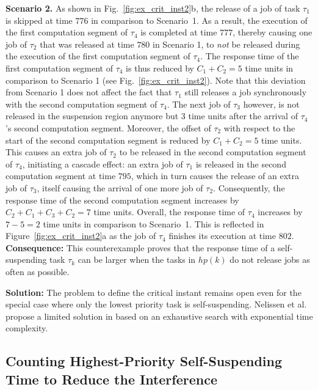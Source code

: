 \noindent\textbf{Scenario 2.} As shown in Fig.~\ref{fig:ex_crit_inst2}b, the release of a job of task $\tau_1$ is skipped at time $776$ in comparison to Scenario~1. As a result, the execution of the first computation segment of $\tau_4$ is completed at time $777$, thereby causing one job of $\tau_2$ that was released at time $780$ in Scenario 1, to \emph{not} be released during the execution of the first computation segment of $\tau_4$. The response time of the first computation segment of $\tau_4$ is thus reduced by $C_1 + C_2 = 5$ time units in comparison to Scenario 1 (see Fig.~\ref{fig:ex_crit_inst2}). Note that this deviation from Scenario 1 does not affect the fact that $\tau_1$ still releases a job synchronously with the second computation segment of $\tau_4$. The next job of $\tau_3$ however, is not released in the suspension region anymore but $3$ time units after the arrival of $\tau_4$'s second computation segment. Moreover, the offset of $\tau_2$ with respect to the start of the second computation segment is reduced by $C_1 + C_2 = 5$ time units. This causes an extra job of $\tau_2$ to be released in the second computation segment of $\tau_4$, initiating a cascade effect: an extra job of $\tau_1$ is released in the second computation segment at time $795$, which in turn causes the release of an extra job of $\tau_3$, itself causing the arrival of one more job of $\tau_2$. Consequently, the response time of the second computation segment increases by $C_2 + C_1 + C_3 + C_2 = 7$ time units. Overall, the response time of $\tau_4$ increases by $7 - 5 = 2$ time units in comparison to Scenario~1. This is reflected in Figure~\ref{fig:ex_crit_inst2}a as the job of $\tau_4$ finishes its execution at time $802$.\\


{\bf Consequence:} This counterexample proves that the response time of a self-suspending task $\tau_k$ can be larger when the tasks in $hp(k)$ do not release jobs as often as possible.

{\bf Solution:} The problem to define the critical instant remains open even for the special case where only the lowest priority task is self-suspending. Nelissen et al. propose a limited solution in \cite{ecrts15nelissen} based on an exhaustive search with exponential time complexity.

\subsection{Counting Highest-Priority Self-Suspending Time to Reduce the Interference}
\label{sec:wrong-highest-priority}

